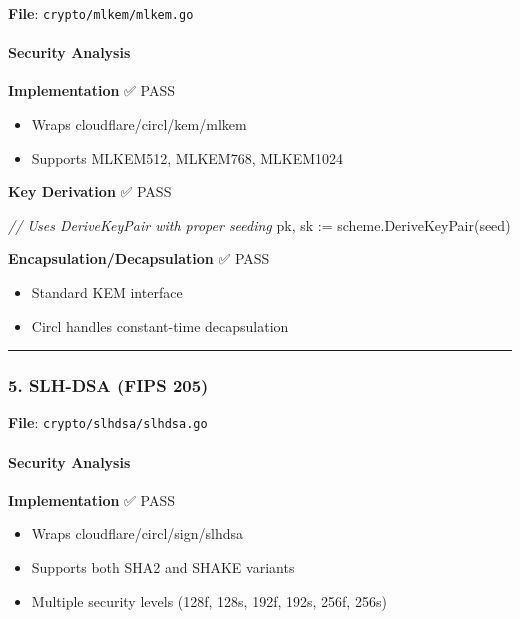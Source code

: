 \documentclass[
]{article}
\newenvironment{Shaded}{}{}
\newcommand{\CommentTok}[1]{\textcolor[rgb]{0.38,0.63,0.69}{\textit{#1}}}
\newcommand{\NormalTok}[1]{#1}
\newcommand{\OperatorTok}[1]{\textcolor[rgb]{0.40,0.40,0.40}{#1}}
\providecommand{\tightlist}{%
  \setlength{\itemsep}{0pt}\setlength{\parskip}{0pt}}
\begin{document}
\textbf{File}: \texttt{crypto/mlkem/mlkem.go}

\paragraph{Security Analysis}\label{security-analysis-3}

\textbf{Implementation} ✅ PASS

\begin{itemize}
\tightlist
\item
  Wraps cloudflare/circl/kem/mlkem
\item
  Supports MLKEM512, MLKEM768, MLKEM1024
\end{itemize}

\textbf{Key Derivation} ✅ PASS

\begin{Shaded}
\begin{Highlighting}[]
\CommentTok{// Uses DeriveKeyPair with proper seeding}
\NormalTok{pk}\OperatorTok{,}\NormalTok{ sk }\OperatorTok{:=}\NormalTok{ scheme}\OperatorTok{.}\NormalTok{DeriveKeyPair}\OperatorTok{(}\NormalTok{seed}\OperatorTok{)}
\end{Highlighting}
\end{Shaded}

\textbf{Encapsulation/Decapsulation} ✅ PASS

\begin{itemize}
\tightlist
\item
  Standard KEM interface
\item
  Circl handles constant-time decapsulation
\end{itemize}

\begin{center}\rule{0.5\linewidth}{0.5pt}\end{center}

\subsubsection{5. SLH-DSA (FIPS 205)}\label{5-slh-dsa-fips-205}

\textbf{File}: \texttt{crypto/slhdsa/slhdsa.go}

\paragraph{Security Analysis}\label{security-analysis-4}

\textbf{Implementation} ✅ PASS

\begin{itemize}
\tightlist
\item
  Wraps cloudflare/circl/sign/slhdsa
\item
  Supports both SHA2 and SHAKE variants
\item
  Multiple security levels (128f, 128s, 192f, 192s, 256f, 256s)
\end{itemize}
\end{document}
